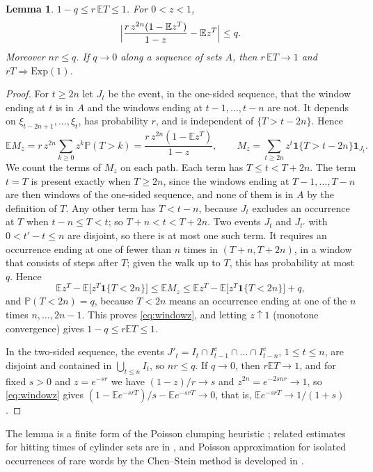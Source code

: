 \documentclass[11pt]{amsart}
\newtheorem{lemma}[theorem]{Lemma}
\theoremstyle{remark}
\numberwithin{equation}{section}
\newcommand{\PP}{\mathbb{P}}
\newcommand{\EE}{\mathbb{E}}
\begin{document}
\begin{lemma}\label{lem:window}
$1-q\le r\,\EE T\le1$. For $0<z<1$,
\begin{equation}\label{eq:windowz}
\Bigl|\frac{r\,z^{2n}(1-\EE z^T)}{1-z}-\EE z^T\Bigr|\le q.
\end{equation}
Moreover $nr\le q$. If $q\to0$ along a sequence of sets $A$, then $r\,\EE T\to1$ and $rT\Rightarrow\mathrm{Exp}(1)$.
\end{lemma}

\begin{proof}
For $t\ge2n$ let $J_t$ be the event, in the one-sided sequence, that the window ending at $t$ is in $A$ and the windows ending at $t-1,\dots,t-n$ are not. It depends on $\xi_{t-2n+1},\dots,\xi_t$, has probability $r$, and is independent of $\{T>t-2n\}$. Hence
\[
\EE M_z=r\,z^{2n}\sum_{k\ge0}z^k\PP(T>k)=\frac{r\,z^{2n}(1-\EE z^T)}{1-z},\qquad M_z=\sum_{t\ge2n}z^t\mathbf 1\{T>t-2n\}\mathbf 1_{J_t}.
\]
We count the terms of $M_z$ on each path. Each term has $T\le t<T+2n$. The term $t=T$ is present exactly when $T\ge2n$, since the windows ending at $T-1,\dots,T-n$ are then windows of the one-sided sequence, and none of them is in $A$ by the definition of $T$. Any other term has $T<t-n$, because $J_t$ excludes an occurrence at $T$ when $t-n\le T<t$; so $T+n<t<T+2n$. Two events $J_t$ and $J_{t'}$ with $0<t'-t\le n$ are disjoint, so there is at most one such term. It requires an occurrence ending at one of fewer than $n$ times in $(T+n,T+2n)$, in a window that consists of steps after $T$; given the walk up to $T$, this has probability at most $q$. Hence
\[
\EE z^T-\EE\bigl[z^T\mathbf 1\{T<2n\}\bigr]\le\EE M_z\le\EE z^T-\EE\bigl[z^T\mathbf 1\{T<2n\}\bigr]+q,
\]
and $\PP(T<2n)=q$, because $T<2n$ means an occurrence ending at one of the $n$ times $n,\dots,2n-1$. This proves \eqref{eq:windowz}, and letting $z\uparrow1$ (monotone convergence) gives $1-q\le r\EE T\le1$.

In the two-sided sequence, the events $J'_t=I_t\cap I_{t-1}^c\cap\dots\cap I_{t-n}^c$, $1\le t\le n$, are disjoint and contained in $\bigcup_{t\le n}I_t$, so $nr\le q$. If $q\to0$, then $r\EE T\to1$, and for fixed $s>0$ and $z=e^{-sr}$ we have $(1-z)/r\to s$ and $z^{2n}=e^{-2snr}\to1$, so \eqref{eq:windowz} gives $(1-\EE e^{-srT})/s-\EE e^{-srT}\to0$, that is, $\EE e^{-srT}\to1/(1+s)$.
\end{proof}

The lemma is a finite form of the Poisson clumping heuristic \cite{Ald89}; related estimates for hitting times of cylinder sets are in \cite{AS11}, and Poisson approximation for isolated occurrences of rare words by the Chen--Stein method is developed in \cite{AGG90}.
\end{document}
